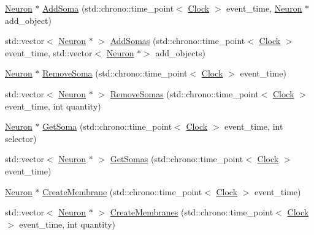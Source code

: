 \begin{DoxyCompactItemize}
\item 
\mbox{\hyperlink{classNeuron}{Neuron}} $\ast$ \mbox{\hyperlink{classNeuron_a6198fa352056e3bbe1e979adf088b900}{Add\+Soma}} (std\+::chrono\+::time\+\_\+point$<$ \mbox{\hyperlink{universe_8h_a0ef8d951d1ca5ab3cfaf7ab4c7a6fd80}{Clock}} $>$ event\+\_\+time, \mbox{\hyperlink{classNeuron}{Neuron}} $\ast$add\+\_\+object)
\item 
std\+::vector$<$ \mbox{\hyperlink{classNeuron}{Neuron}} $\ast$ $>$ \mbox{\hyperlink{classNeuron_a78a0f48a669b6ea20280829304e51de2}{Add\+Somas}} (std\+::chrono\+::time\+\_\+point$<$ \mbox{\hyperlink{universe_8h_a0ef8d951d1ca5ab3cfaf7ab4c7a6fd80}{Clock}} $>$ event\+\_\+time, std\+::vector$<$ \mbox{\hyperlink{classNeuron}{Neuron}} $\ast$$>$ add\+\_\+objects)
\item 
\mbox{\hyperlink{classNeuron}{Neuron}} $\ast$ \mbox{\hyperlink{classNeuron_a4f8c2f0c1b294493a7c581a7f46c2863}{Remove\+Soma}} (std\+::chrono\+::time\+\_\+point$<$ \mbox{\hyperlink{universe_8h_a0ef8d951d1ca5ab3cfaf7ab4c7a6fd80}{Clock}} $>$ event\+\_\+time)
\item 
std\+::vector$<$ \mbox{\hyperlink{classNeuron}{Neuron}} $\ast$ $>$ \mbox{\hyperlink{classNeuron_a976b1bab63d0bd21b1c8c8e1cfbd17fe}{Remove\+Somas}} (std\+::chrono\+::time\+\_\+point$<$ \mbox{\hyperlink{universe_8h_a0ef8d951d1ca5ab3cfaf7ab4c7a6fd80}{Clock}} $>$ event\+\_\+time, int quantity)
\item 
\mbox{\hyperlink{classNeuron}{Neuron}} $\ast$ \mbox{\hyperlink{classNeuron_a8539a7965349078a7b1c1265895daefa}{Get\+Soma}} (std\+::chrono\+::time\+\_\+point$<$ \mbox{\hyperlink{universe_8h_a0ef8d951d1ca5ab3cfaf7ab4c7a6fd80}{Clock}} $>$ event\+\_\+time, int selector)
\item 
std\+::vector$<$ \mbox{\hyperlink{classNeuron}{Neuron}} $\ast$ $>$ \mbox{\hyperlink{classNeuron_a867fbd498b54c115a2c8769f83c48020}{Get\+Somas}} (std\+::chrono\+::time\+\_\+point$<$ \mbox{\hyperlink{universe_8h_a0ef8d951d1ca5ab3cfaf7ab4c7a6fd80}{Clock}} $>$ event\+\_\+time)
\item 
\mbox{\hyperlink{classNeuron}{Neuron}} $\ast$ \mbox{\hyperlink{classNeuron_af06efbcc1a96af0290673e9e048267cf}{Create\+Membrane}} (std\+::chrono\+::time\+\_\+point$<$ \mbox{\hyperlink{universe_8h_a0ef8d951d1ca5ab3cfaf7ab4c7a6fd80}{Clock}} $>$ event\+\_\+time)
\item 
std\+::vector$<$ \mbox{\hyperlink{classNeuron}{Neuron}} $\ast$ $>$ \mbox{\hyperlink{classNeuron_a5f6f460c6a98319a05c3ba06d14e6f60}{Create\+Membranes}} (std\+::chrono\+::time\+\_\+point$<$ \mbox{\hyperlink{universe_8h_a0ef8d951d1ca5ab3cfaf7ab4c7a6fd80}{Clock}} $>$ event\+\_\+time, int quantity)
$$
\end{DoxyCompactItemize}
